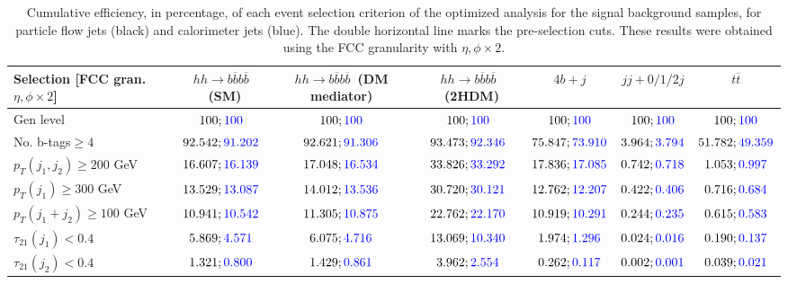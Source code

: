 \begin{landscape}
		\begin{table}
			\centering
			\caption{Cumulative efficiency, in percentage, of each event selection criterion of the optimized analysis for the signal background samples, for particle flow jets (black) and calorimeter jets (blue). The double horizontal line marks the pre-selection cuts. These results were obtained using the FCC granularity with $\eta,\phi\times 2$.}
			\begin{tabular}{lcccccc}
				\toprule 
				\textbf{Selection [FCC gran. $\eta,\phi\times 2$]} & $hh\rightarrow b\overline{b}b\overline{b}$~(SM) & $hh\rightarrow b\overline{b}b\overline{b}$~(DM mediator) & $hh\rightarrow b\overline{b}b\overline{b}$~(2HDM) & $4b+j$  & $jj+0/1/2 j$ & $t\overline{t}$ \\
				\midrule
				Gen level & $100;\textcolor{blue}{100}$ & $100;\textcolor{blue}{100}$ &$100;\textcolor{blue}{100}$& $100;\textcolor{blue}{100}$& $100;\textcolor{blue}{100}$& $100;\textcolor{blue}{100}$ \\
				\rowcolor{black!7}No. b-tags$\geq 4$&$92.542;\textcolor{blue}{91.202}$&$92.621;\textcolor{blue}{91.306}$&$93.473;\textcolor{blue}{92.346}$&$75.847;\textcolor{blue}{73.910}$&$3.964;\textcolor{blue}{3.794}$&$51.782;\textcolor{blue}{49.359}$\\
				$p_T(j_1,j_2)\geq200$ GeV & $16.607;\textcolor{blue}{16.139}$ & $17.048;\textcolor{blue}{16.534}$&$33.826;\textcolor{blue}{33.292}$ &$17.836;\textcolor{blue}{17.085}$&$0.742;\textcolor{blue}{0.718}$&$1.053;\textcolor{blue}{0.997}$\\ 
				\midrule \midrule
				\rowcolor{black!7}$p_T(j_1)\geq 300$ GeV & $13.529;\textcolor{blue}{13.087}$ &$14.012;\textcolor{blue}{13.536}$  &$30.720;\textcolor{blue}{30.121}$&$12.762;\textcolor{blue}{12.207}$&$0.422;\textcolor{blue}{0.406}$&$0.716;\textcolor{blue}{0.684}$\\ 
				$p_T(j_1+j_2)\geq 100$ GeV &$10.941;\textcolor{blue}{10.542}$ & $11.305;\textcolor{blue}{10.875}$ &$22.762;\textcolor{blue}{22.170}$&$10.919;\textcolor{blue}{10.291}$&$0.244;\textcolor{blue}{0.235}$&$0.615;\textcolor{blue}{0.583}$\\
				\rowcolor{black!7}$\tau_{21}(j_1)<0.4$ & $5.869;\textcolor{blue}{4.571}$& $6.075;\textcolor{blue}{4.716}$&$13.069;\textcolor{blue}{10.340}$&$1.974;\textcolor{blue}{1.296}$&$0.024;\textcolor{blue}{0.016}$&$0.190;\textcolor{blue}{0.137}$\\
				$\tau_{21}(j_2)<0.4$ &$1.321;\textcolor{blue}{0.800}$ &$1.429;\textcolor{blue}{0.861}$ &$3.962;\textcolor{blue}{2.554}$&$0.262;\textcolor{blue}{0.117}$&$0.002;\textcolor{blue}{0.001}$&$0.039;\textcolor{blue}{0.021}$\\

\end{tabular}
\end{table}
\end{landscape}
